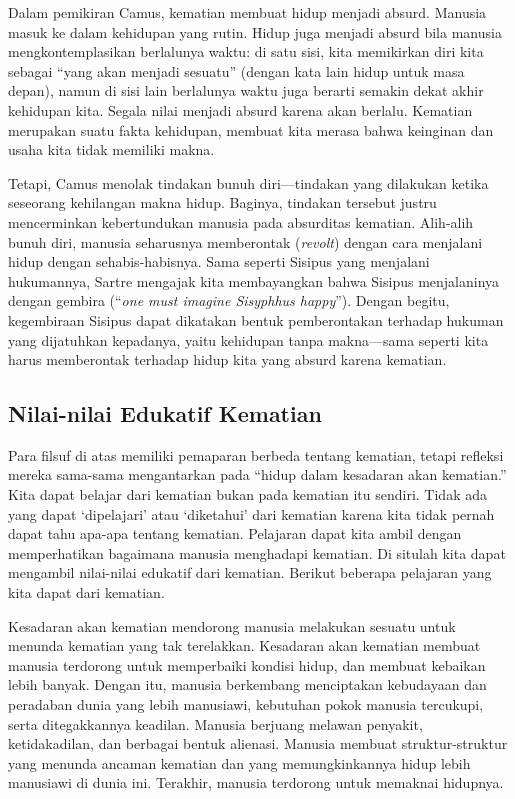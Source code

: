 \documentclass[11pt,twoside,a5paper,openany]{memoir}
\begin{document}
Dalam pemikiran Camus, kematian membuat hidup menjadi absurd. Manusia
masuk ke dalam kehidupan yang rutin. Hidup juga menjadi absurd bila
manusia mengkontemplasikan berlalunya waktu: di satu sisi, kita
memikirkan diri kita sebagai ``yang akan menjadi sesuatu'' (dengan kata
lain hidup untuk masa depan), namun di sisi lain berlalunya waktu juga
berarti semakin dekat akhir kehidupan kita. Segala nilai menjadi absurd
karena akan berlalu. Kematian merupakan suatu fakta kehidupan, membuat
kita merasa bahwa keinginan dan usaha kita tidak memiliki makna.

Tetapi, Camus menolak tindakan bunuh diri---tindakan yang dilakukan
ketika seseorang kehilangan makna hidup. Baginya, tindakan tersebut
justru mencerminkan kebertundukan manusia pada absurditas kematian.
Alih-alih bunuh diri, manusia seharusnya memberontak (\emph{revolt})
dengan cara menjalani hidup dengan sehabis-habisnya. Sama seperti
Sisipus yang menjalani hukumannya, Sartre mengajak kita membayangkan
bahwa Sisipus menjalaninya dengan gembira (``\emph{one must imagine
Sisyphhus happy}''). Dengan begitu, kegembiraan Sisipus dapat dikatakan
bentuk pemberontakan terhadap hukuman yang dijatuhkan kepadanya, yaitu
kehidupan tanpa makna---sama seperti kita harus memberontak terhadap
hidup kita yang absurd karena kematian.

\hypertarget{nilai-nilai-edukatif-kematian}{%
\subsection{Nilai-nilai Edukatif
Kematian}\label{nilai-nilai-edukatif-kematian}}

Para filsuf di atas memiliki pemaparan berbeda tentang kematian, tetapi
refleksi mereka sama-sama mengantarkan pada ``hidup dalam kesadaran akan
kematian.'' Kita dapat belajar dari kematian bukan pada kematian itu
sendiri. Tidak ada yang dapat `dipelajari' atau `diketahui' dari
kematian karena kita tidak pernah dapat tahu apa-apa tentang kematian.
Pelajaran dapat kita ambil dengan memperhatikan bagaimana manusia
menghadapi kematian. Di situlah kita dapat mengambil nilai-nilai
edukatif dari kematian. Berikut beberapa pelajaran yang kita dapat dari
kematian.

Kesadaran akan kematian mendorong manusia melakukan sesuatu untuk
menunda kematian yang tak terelakkan. Kesadaran akan kematian membuat
manusia terdorong untuk memperbaiki kondisi hidup, dan membuat kebaikan
lebih banyak. Dengan itu, manusia berkembang menciptakan kebudayaan dan
peradaban dunia yang lebih manusiawi, kebutuhan pokok manusia tercukupi,
serta ditegakkannya keadilan. Manusia berjuang melawan penyakit,
ketidakadilan, dan berbagai bentuk alienasi. Manusia membuat
struktur-struktur yang menunda ancaman kematian dan yang memungkinkannya
hidup lebih manusiawi di dunia ini. Terakhir, manusia terdorong untuk
memaknai hidupnya.
\end{document}
